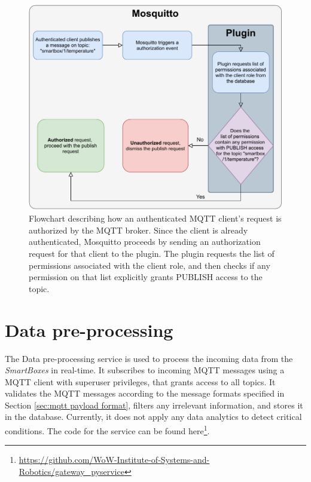 \begin{figure}[H]
    \centering
    \includegraphics[width=\linewidth]{images/mqtt authorization.pdf}
    \caption[Flowchart describing how a PUBLISH request from an authenticated \acs{MQTT} client is authorized by the \acs{MQTT} broker.]{Flowchart describing how an authenticated \acs{MQTT} client's request is authorized by the \acs{MQTT} broker. Since the client is already authenticated, Mosquitto proceeds by sending an authorization request for that client to the plugin. The plugin requests the list of permissions associated with the client role, and then checks if any permission on that list explicitly grants PUBLISH access to the topic.}
    \label{fig:mqtt-plugin-authzflow}
\end{figure}
\section{Data pre-processing}

The Data pre-processing service is used to process the incoming data from the \textit{SmartBoxes} in real-time. It subscribes to incoming \acs{MQTT} messages using a \acs{MQTT} client with superuser privileges, that grants access to all topics. It validates the \acs{MQTT} messages according to the message formats specified in Section \ref{sec:mqtt payload format}, filters any irrelevant information, and stores it in the database. Currently, it does not apply any data analytics to detect critical conditions. The code for the service can be found here\footnote{\url{https://github.com/WoW-Institute-of-Systems-and-Robotics/gateway_pyservice}}. 

